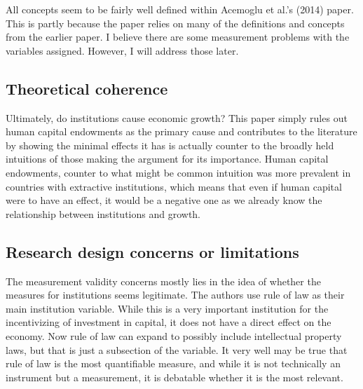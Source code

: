 \documentclass[12pt]{article}
\begin{document}
{All concepts seem to be fairly well defined within Acemoglu et al.'s (2014) paper. This is partly because the paper relies on many of the definitions and concepts from the earlier paper. I believe there are some measurement problems with the variables assigned. However, I will address those later.\\







\subsection{Theoretical coherence}


Ultimately, do institutions cause economic growth? This paper simply rules out human capital endowments as the primary cause and contributes to the literature by showing the minimal effects it has is actually counter to the broadly held intuitions of those making the argument for its importance. Human capital endowments, counter to what might be common intuition was more prevalent in countries with extractive institutions, which means that even if human capital were to have an effect, it would be a negative one as we already know the relationship between institutions and growth.\\

\subsection{Research design concerns or limitations}


The measurement validity concerns mostly lies in the idea of whether the measures for institutions seems legitimate. The authors use rule of law as their main institution variable. While this is a very important institution for the incentivizing of investment in capital, it does not have a direct effect on the economy. Now rule of law can expand to possibly include intellectual property laws, but that is just a subsection of the variable. It very well may be true that rule of law is the most quantifiable measure, and while it is not technically an instrument but a measurement, it is debatable whether it is the most relevant.\\

}
\end{document}
